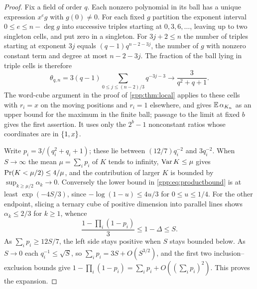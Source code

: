 \begin{proof}
Fix a field of order $q$. Each nonzero polynomial in its ball has a unique expression
$x^eg$ with $g(0)\ne0$. For each fixed $g$ partition the exponent interval
$0\le e\le n-\deg g$ into successive triples starting at $0,3,6,\ldots$, leaving up to
two singleton cells, and put zero in a singleton. For $3j+2\le n$ the number of triples
starting at exponent $3j$ equals $(q-1)q^{n-2-3j}$, the number of $g$ with nonzero
constant term and degree at most $n-2-3j$. The fraction of the ball lying in triple cells
is therefore
\[
 \theta_{q,n}=3(q-1)\sum_{0\le j\le(n-2)/3}q^{-3j-3}\longrightarrow\frac{3}{q^2+q+1}.
\]
The word-cube argument in the proof of \cref{gpp:thm:local} applies to these cells with
$r_i=x$ on the moving positions and $r_i=1$ elsewhere, and gives $\mathbb{E}\,\alpha_{K_n}$ as
an upper bound for the maximum in the finite ball; passage to the limit at fixed $b$
gives the first assertion. It uses only the $2^b-1$ nonconstant ratios whose coordinates
are in $\{1,x\}$.

Write $p_i=3/(q_i^2+q_i+1)$; these lie between $(12/7)q_i^{-2}$ and $3q_i^{-2}$. When
$S\to\infty$ the mean $\mu=\sum_ip_i$ of $K$ tends to infinity, $\operatorname{Var} K\le\mu$ gives
$\operatorname{Pr}(K<\mu/2)\le4/\mu$, and the contribution of larger $K$ is bounded by
$\sup_{k\ge\mu/2}\alpha_k\to0$. Conversely the lower bound in
\eqref{gpp:eq:productbound} is at least $\exp(-4S/3)$, since $-\log(1-u)\le4u/3$ for
$0\le u\le1/4$. For the other endpoint, slicing a ternary cube of positive dimension into
parallel lines shows $\alpha_k\le2/3$ for $k\ge1$, whence
\[
 \frac{1-\prod_i(1-p_i)}{3}\le1-\Delta\le S .
\]
As $\sum_ip_i\ge12S/7$, the left side stays positive when $S$ stays bounded below. As
$S\to0$ each $q_i^{-1}\le\sqrt S$, so $\sum_ip_i=3S+O(S^{3/2})$, and the first two
inclusion--exclusion bounds give
$1-\prod_i(1-p_i)=\sum_ip_i+O((\sum_ip_i)^2)$. This proves the expansion.
\end{proof}


